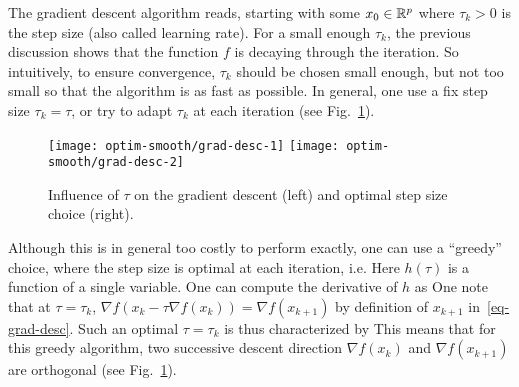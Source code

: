 The gradient descent algorithm reads, starting with some $x_0 \in \mathbb{R}^p$
where $\tau_k>0$ is the step size (also called learning rate). For a small enough $\tau_k$, the previous discussion shows that the function $f$ is decaying through the iteration. So intuitively, to ensure convergence, $\tau_k$ should be chosen small enough, but not too small so that the algorithm is as fast as possible.
%
In general, one use a fix step size $\tau_k=\tau$, or try to adapt $\tau_k$ at each iteration (see Fig.~\ref{fig-gradesc}). 


\begin{figure}
\centering
\texttt{[image: optim-smooth/grad-desc-1]} \quad
\texttt{[image: optim-smooth/grad-desc-2]} 
\caption{\label{fig-gradesc}
Influence of $\tau$ on the gradient descent (left) and optimal step size choice (right).
}
\end{figure}


\begin{rem}
Although this is in general too costly to perform exactly, one can use a ``greedy'' choice, where the step size is optimal at each iteration, i.e. 
Here $h(\tau)$ is a function of a single variable. One can compute the derivative of $h$ as
One note that at $\tau=\tau_k$, $\nabla f(x_k-\tau \nabla f(x_k))=\nabla f(x_{k+1})$ by definition of $x_{k+1}$ in~\eqref{eq-grad-desc}. 
%
Such an optimal $\tau=\tau_k$ is thus characterized by
This means that for this greedy algorithm, two successive descent direction $\nabla f(x_k)$ and $\nabla f(x_{k+1})$ are orthogonal (see Fig.~\ref{fig-gradesc}).
\end{rem}

